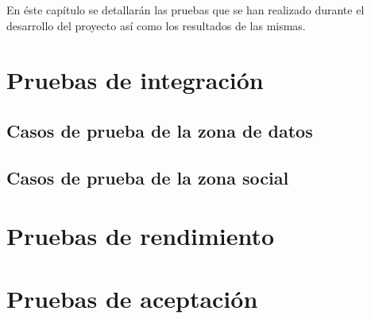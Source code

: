 En éste capítulo se detallarán las pruebas que se han realizado durante el desarrollo del proyecto así como los resultados de las mismas.


\section{Pruebas de integración}
\label{pruebas:integracion}
	
	
	\subsection{Casos de prueba de la zona de datos}
	\label{pruebas:integracion:zona_datos}
	
	
	
	\subsection{Casos de prueba de la zona social}
	\label{pruebas:integracion:zona_social}
	


\section{Pruebas de rendimiento}
\label{pruebas:rendimiento}



\section{Pruebas de aceptación}
\label{pruebas:aceptacion}